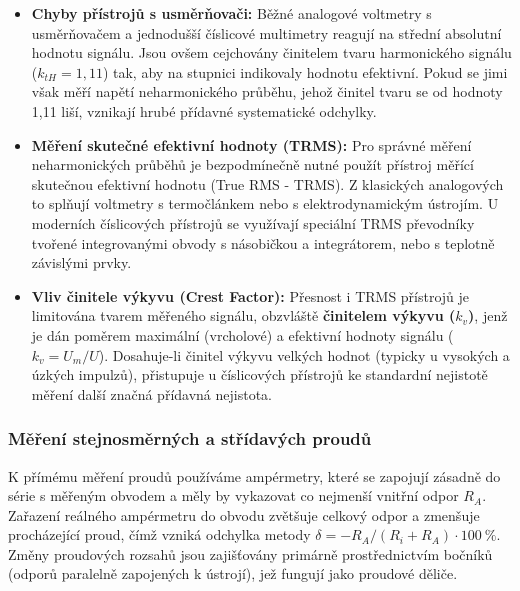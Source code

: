         \begin{itemize}
            \item \textbf{Chyby přístrojů s usměrňovači:} Běžné analogové voltmetry s usměrňovačem a jednodušší číslicové multimetry  reagují na střední absolutní hodnotu signálu. Jsou ovšem cejchovány činitelem tvaru harmonického signálu ($k_{tH} = 1,11$) tak, aby na stupnici indikovaly hodnotu efektivní. Pokud se jimi však měří napětí neharmonického průběhu, jehož činitel tvaru se od hodnoty 1,11 liší, vznikají hrubé přídavné systematické odchylky.
            \item \textbf{Měření skutečné efektivní hodnoty (TRMS):} Pro správné měření neharmonických průběhů je bezpodmínečně nutné použít přístroj měřící skutečnou efektivní hodnotu (True RMS - TRMS). Z klasických analogových to splňují voltmetry s termočlánkem nebo s elektrodynamickým ústrojím. U moderních číslicových přístrojů se využívají speciální TRMS převodníky tvořené integrovanými obvody s násobičkou a integrátorem, nebo s teplotně závislými prvky.
            \item \textbf{Vliv činitele výkyvu (Crest Factor):} Přesnost i TRMS přístrojů je limitována tvarem měřeného signálu, obzvláště \textbf{činitelem výkyvu ($k_v$)}, jenž je dán poměrem maximální (vrcholové) a efektivní hodnoty signálu ($k_v = U_m/U$). Dosahuje-li činitel výkyvu velkých hodnot (typicky u vysokých a úzkých impulzů), přistupuje u číslicových přístrojů ke standardní nejistotě měření další značná přídavná nejistota.
        \end{itemize}
    \subsubsection{Měření stejnosměrných a střídavých proudů}
        K přímému měření proudů používáme ampérmetry, které se zapojují zásadně do série s měřeným obvodem a měly by vykazovat co nejmenší vnitřní odpor $R_A$. Zařazení reálného ampérmetru do obvodu zvětšuje celkový odpor a zmenšuje procházející proud, čímž vzniká odchylka metody $\delta = -R_A / (R_i + R_A) \cdot 100\ \%$. Změny proudových rozsahů jsou zajišťovány primárně prostřednictvím bočníků (odporů paralelně zapojených k ústrojí), jež fungují jako proudové děliče.
        
